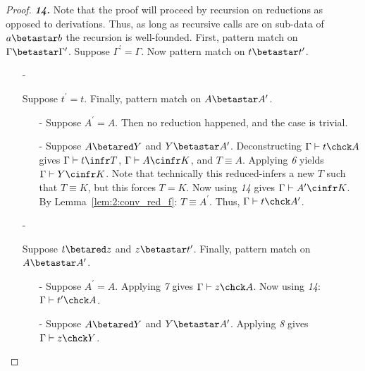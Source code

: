 \begin{proof}
    \noindent \textbf{\textit{14.}}
    Note that the proof will proceed by recursion on reductions as opposed to derivations.
    Thus, as long as recursive calls are on sub-data of $a \betastar b$ the recursion is well-founded.
    First, pattern match on $\Gamma \betastar \Gamma^\prime$.
    Suppose $\Gamma^\prime = \Gamma$.
    Now pattern match on $t \betastar t^\prime$.
    \begin{enumerate}
        \item[-] {
            Suppose $t^\prime = t$.
            Finally, pattern match on $A \betastar A^\prime$.
            \begin{enumerate}
                \item[-] {
                    Suppose $A^\prime = A$.
                    Then no reduction happened, and the case is trivial.
                }
                \item[-] {
                    Suppose $A \betared Y$ and $Y \betastar A^\prime$.
                    Deconstructing $\Gamma \vdash t \chck A$ gives $\Gamma \vdash t \infr T$, $\Gamma \vdash A \cinfr K$, and $T \equiv A$.
                    Applying \textit{6} yields $\Gamma \vdash Y \cinfr K$.
                    Note that technically this reduced-infers a new $T$ such that $T \equiv K$, but this forces $T = K$.
                    Now using \textit{14} gives $\Gamma \vdash A^\prime \cinfr K$.
                    By Lemma~\ref{lem:2:conv_red_f}: $T \equiv A^\prime$.
                    Thus, $\Gamma \vdash t \chck A^\prime$.
                }
            \end{enumerate}
        }
        \item[-] {
            Suppose $t \betared z$ and $z \betastar t^\prime$.
            Finally, pattern match on $A \betastar A^\prime$.
            \begin{enumerate}
                \item[-] {
                    Suppose $A^\prime = A$.
                    Applying \textit{7} gives $\Gamma \vdash z \chck A$.
                    Now using \textit{14}: $\Gamma \vdash t^\prime \chck A$.
                }
                \item[-] {
                    Suppose $A \betared Y$ and $Y \betastar A^\prime$.
                    Applying \textit{8} gives $\Gamma \vdash z \chck Y$.
}
\end{enumerate}}
\end{enumerate}
\end{proof}
